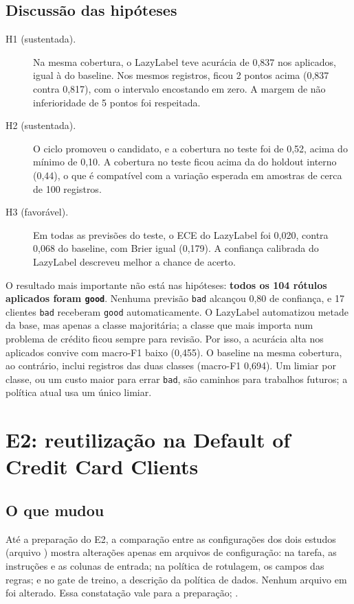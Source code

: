 \subsection{Discussão das hipóteses}

\begin{description}
  \item[H1 (sustentada).] Na mesma cobertura, o LazyLabel teve acurácia de 0,837 nos aplicados, igual à do baseline. Nos mesmos registros, ficou 2 pontos acima (0,837 contra 0,817), com o intervalo encostando em zero. A margem de não inferioridade de 5 pontos foi respeitada.
  \item[H2 (sustentada).] O ciclo promoveu o candidato, e a cobertura no teste foi de 0,52, acima do mínimo de 0,10. A cobertura no teste ficou acima da do holdout interno (0,44), o que é compatível com a variação esperada em amostras de cerca de 100 registros.
  \item[H3 (favorável).] Em todas as previsões do teste, o ECE do LazyLabel foi 0,020, contra 0,068 do baseline, com Brier igual (0,179). A confiança calibrada do LazyLabel descreveu melhor a chance de acerto.
\end{description}

O resultado mais importante não está nas hipóteses: \textbf{todos os 104 rótulos aplicados foram \texttt{good}}. Nenhuma previsão \texttt{bad} alcançou 0,80 de confiança, e 17 clientes \texttt{bad} receberam \texttt{good} automaticamente. O LazyLabel automatizou metade da base, mas apenas a classe majoritária; a classe que mais importa num problema de crédito ficou sempre para revisão. Por isso, a acurácia alta nos aplicados convive com macro-F1 baixo (0,455). O baseline na mesma cobertura, ao contrário, inclui registros das duas classes (macro-F1 0,694). Um limiar por classe, ou um custo maior para errar \texttt{bad}, são caminhos para trabalhos futuros; a política atual usa um único limiar.

\section{E2: reutilização na Default of Credit Card Clients}

\subsection{O que mudou}

Até a preparação do E2, a comparação entre as configurações dos dois estudos (arquivo ) mostra alterações apenas em arquivos de configuração: na tarefa, as instruções e as colunas de entrada; na política de rotulagem, os campos das regras; e no gate de treino, a descrição da política de dados. Nenhum arquivo em  foi alterado. Essa constatação vale para a preparação; .

